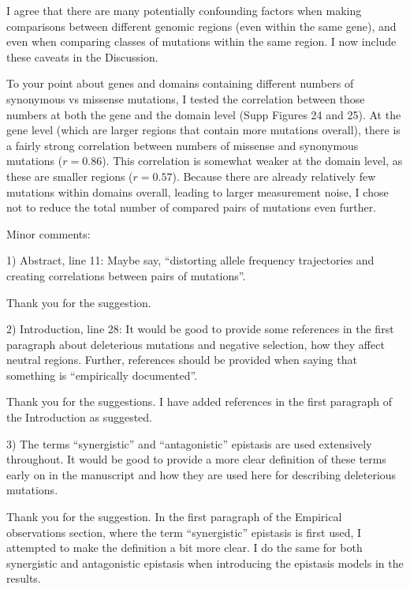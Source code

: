 \documentclass{article}
\newenvironment{response}%
  {\list{}{\leftmargin=0.5in\rightmargin=0.5in\color{blue}}\item[]}%
  {\endlist}
\begin{document}
\begin{response}
    I agree that there are many potentially confounding factors when making comparisons
    between different genomic regions (even within the same gene), and even when
    comparing classes of mutations within the same region. I now include
    these caveats in the Discussion.
    
    To your point about genes and domains containing different numbers of synonymous
    vs missense mutations, I tested the correlation between those numbers at both
    the gene and the domain level (Supp Figures 24 and 25). At the gene level (which
    are larger regions that contain more mutations overall), there is a fairly strong
    correlation between numbers of missense and synonymous mutations ($r=0.86$).
    This correlation is somewhat weaker at the domain level,
    as these are smaller regions ($r=0.57$). Because there are already relatively few
    mutations within domains overall, leading to larger measurement noise, I chose not
    to reduce the total number of compared pairs of mutations even further.
\end{response}

Minor comments:

1) Abstract, line 11: Maybe say, ``distorting allele frequency trajectories and
creating correlations between pairs of mutations''.

\begin{response}
    Thank you for the suggestion.
\end{response}

2) Introduction, line 28: It would be good to provide some references in the
first paragraph about deleterious mutations and negative selection, how they
affect neutral regions. Further, references should be provided when saying that
something is ``empirically documented''.

\begin{response}
    Thank you for the suggestions. I have added references in the first paragraph
    of the Introduction as suggested.
\end{response}

3) The terms ``synergistic'' and ``antagonistic'' epistasis are used extensively
throughout. It would be good to provide a more clear definition of these terms
early on in the manuscript and how they are used here for describing
deleterious mutations.

\begin{response}
    Thank you for the suggestion. In the first paragraph of the Empirical observations
    section, where the term ``synergistic'' epistasis is first used, I attempted
    to make the definition a bit more clear. I do the same for both synergistic and
    antagonistic epistasis when introducing the epistasis models in the results.
\end{response}
\end{document}
